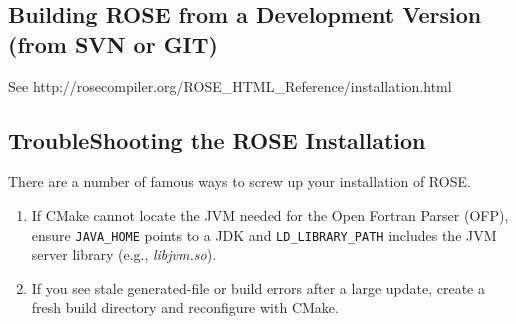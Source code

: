 
\subsection{Building ROSE from a Development Version (from SVN or GIT)}
\label{gettingStarted:UserInstructionsForDevelopmentVersion}

See http://rosecompiler.org/ROSE\_HTML\_Reference/installation.html


\subsection{TroubleShooting the ROSE Installation}


   There are a number of famous ways to screw up your installation of ROSE.
\begin{enumerate}
   \item If CMake cannot locate the JVM needed for the Open Fortran Parser (OFP),
   ensure {\tt JAVA\_HOME} points to a JDK and {\tt LD\_LIBRARY\_PATH} includes the
   JVM server library (e.g., {\em libjvm.so}).

   \item If you see stale generated-file or build errors after a large update,
   create a fresh build directory and reconfigure with CMake.
\end{enumerate}



